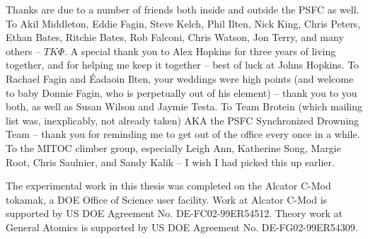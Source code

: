 Thanks are due to a number of friends both inside and outside the PSFC as well.  To Akil Middleton, Eddie Fagin, Steve Kelch, Phil Ilten, Nick King, Chris Peters, Ethan Bates, Ritchie Bates, Rob Falconi, Chris Watson, Jon Terry, and many others -- $TK \Phi$.  A special thank you to Alex Hopkins for three years of living together, and for helping me keep it together -- best of luck at Johns Hopkins.  To Rachael Fagin and \'Eadaoin Ilten, your weddings were high points (and welcome to baby Donnie Fagin, who is perpetually out of his element) -- thank you to you both, as well as Susan Wilson and Jaymie Testa.  To Team Brotein (which mailing list was, inexplicably, not already taken) AKA the PSFC Synchronized Drowning Team -- thank you for reminding me to get out of the office every once in a while.  To the MITOC climber group, especially Leigh Ann, Katherine Song, Margie Root, Chris Saulnier, and Sandy Kalik -- I wish I had picked this up earlier.

The experimental work in this thesis was completed on the Alcator C-Mod tokamak, a DOE Office of Science user facility.  Work at Alcator C-Mod is supported by US DOE Agreement No. DE-FC02-99ER54512.  Theory work at General Atomics is supported by US DOE Agreement No. DE-FG02-99ER54309.